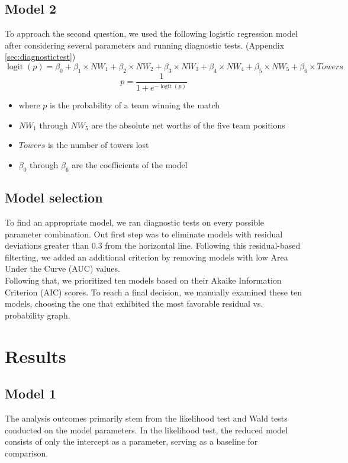 \documentclass[11pt]{article}
\DeclareMathOperator{\logit}{logit}
\begin{document}
\subsection{Model 2}
To approach the second question, we used the following logistic regression model
after considering several parameters and running diagnostic tests. (Appendix \ref{sec:diagnostictest})
\[\logit(p) = \beta_0 + \beta_1 \times NW_1 + \beta_2 \times NW_2 + \beta_3 \times NW_3 + \beta_4 \times NW_4 + \beta_5 \times NW_5 + \beta_6 \times Towers\]
\[p = \frac{1}{1 + e^{-\logit(p)}}\]
\begin{itemize}
    \item where \(p\) is the probability of a team winning the match
    \item \(NW_1\) through \(NW_5\) are the absolute net worths of the five team positions
    \item \(Towers\) is the number of towers lost
    \item \(\beta_0\) through \(\beta_6\) are the coefficients of the model
\end{itemize}

\subsection{Model selection}
To find an appropriate model, we ran diagnostic tests on every possible
parameter combination. Out first step was to eliminate models with residual
deviations greater than 0.3 from the horizontal line. Following this residual-based
filterting, we added an additional criterion by removing models with low
Area Under the Curve (AUC) values.
\\

Following that, we prioritized ten models based on their Akaike Information
Criterion (AIC) scores. To reach a final decision, we manually examined these
ten models, choosing the one that exhibited the most favorable residual vs.
probability graph.

\section{Results}
\subsection{Model 1}
The analysis outcomes primarily stem from the likelihood test and Wald tests
conducted on the model parameters. In the likelihood test, the reduced model
consists of only the intercept as a parameter, serving as a baseline for comparison.
\end{document}
